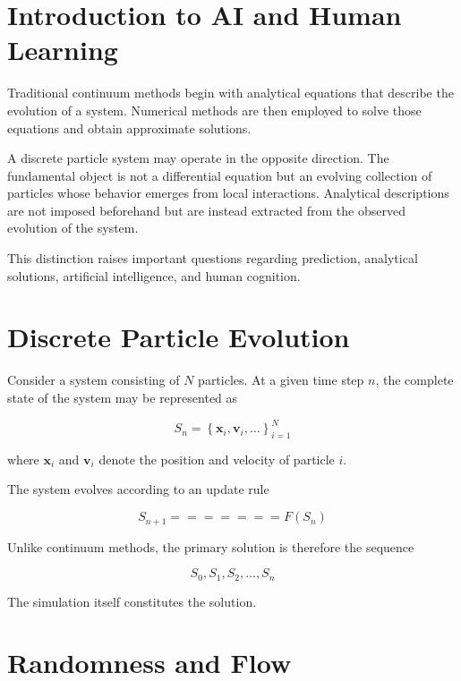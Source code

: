 \section{Introduction to AI and Human Learning}


Traditional continuum methods begin with analytical equations that describe the evolution of a system. Numerical methods are then employed to solve those equations and obtain approximate solutions.

A discrete particle system may operate in the opposite direction. The fundamental object is not a differential equation but an evolving collection of particles whose behavior emerges from local interactions. Analytical descriptions are not imposed beforehand but are instead extracted from the observed evolution of the system.

This distinction raises important questions regarding prediction, analytical solutions, artificial intelligence, and human cognition.

\section{Discrete Particle Evolution}

Consider a system consisting of $N$ particles. At a given time step $n$, the complete state of the system may be represented as


\begin{equation}
S_n
=
\left\{
\mathbf{x}_i,
\mathbf{v}_i,
\ldots
\right\}_{i=1}^{N}
\label{eq:state}
\end{equation}


where $\mathbf{x}_i$ and $\mathbf{v}_i$ denote the position and velocity of particle $i$.

The system evolves according to an update rule

\begin{equation}
S_{n+1}
=======
F(S_n)
\label{eq:update}
\end{equation}

Unlike continuum methods, the primary solution is therefore the sequence

\begin{equation}
S_0,
S_1,
S_2,
\ldots,
S_n
\label{eq:trajectory}
\end{equation}

The simulation itself constitutes the solution.

\section{Randomness and Flow}


